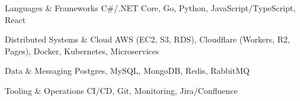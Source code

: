 
\begin{cvskills}
  \cvskill
    {Languages \& Frameworks}
    {C\#/.NET Core, Go, Python, JavaScript/TypeScript, React}

  \cvskill
    {Distributed Systems \& Cloud}
    {AWS (EC2, S3, RDS), Cloudflare (Workers, R2, Pages), Docker, Kubernetes, Microservices}

  \cvskill
    {Data \& Messaging}
    {Postgres, MySQL, MongoDB, Redis, RabbitMQ}

  \cvskill
    {Tooling \& Operations}
    {CI/CD, Git, Monitoring, Jira/Confluence}
\end{cvskills}
